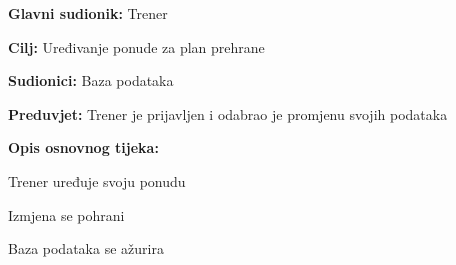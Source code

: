 				\noindent {}
					\begin{packed_item}
	
						\item \textbf{Glavni sudionik: } Trener
						\item  \textbf{Cilj:} Uređivanje ponude za plan prehrane
						\item  \textbf{Sudionici:} Baza podataka
						\item  \textbf{Preduvjet:} Trener je prijavljen i odabrao je promjenu svojih podataka
						\item  \textbf{Opis osnovnog tijeka:}
						
						\item[] \begin{packed_enum}
	
							\item Trener uređuje svoju ponudu
							\item Izmjena se pohrani
							\item Baza podataka se ažurira
						\end{packed_enum}
						
					\end{packed_item}
				
